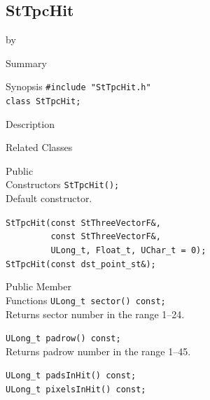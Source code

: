 \documentclass[twoside]{article}
\newcommand{\entrylabel}[1]{\mbox{\textbf{{#1}}}\hfil}%
\newenvironment{entry}
{\begin{list}{}%
    {\renewcommand{\makelabel}{\entrylabel}%
     \setlength{\labelwidth}{90pt}%
     \setlength{\leftmargin}{\labelwidth}
     \advance\leftmargin by \labelsep%
      }%
    }%
  {\end{list}}
\newcommand{\Entrylabel}[1]%
{\raisebox{0pt}[1ex][0pt]{\makebox[\labelwidth][l]%
    {\parbox[t]{\labelwidth}{\hspace{0pt}\textbf{{#1}}}}}}
\newenvironment{Entry}%
{\renewcommand{\entrylabel}{\Entrylabel}\begin{entry}}%
  {\end{entry}}
\begin{document}
\subsection{StTpcHit}
\label{sec:StTpcHit}
\begin{Entry}
\item[Summary]
\item[Synopsis]
    \verb+#include "StTpcHit.h"+\\
    \verb+class StTpcHit;+\\
\item[Description]
\item[Related Classes]
\item[Public\\ Constructors]
    \verb+StTpcHit();+\\
    Default constructor.
    
    \verb+StTpcHit(const StThreeVectorF&,+\\
    \verb+         const StThreeVectorF&,+\\
    \verb+         ULong_t, Float_t, UChar_t = 0);+\\
    
    \verb+StTpcHit(const dst_point_st&);+\\
    
\item[Public Member\\ Functions]
    \verb+ULong_t sector() const;+\\
    Returns sector number in the range 1--24.
    
    \verb+ULong_t padrow() const;+\\
    Returns padrow number in the range 1--45.

    \verb+ULong_t padsInHit() const;+\\
    
    \verb+ULong_t pixelsInHit() const;+\\
\end{Entry}
\clearpage
\end{document}
